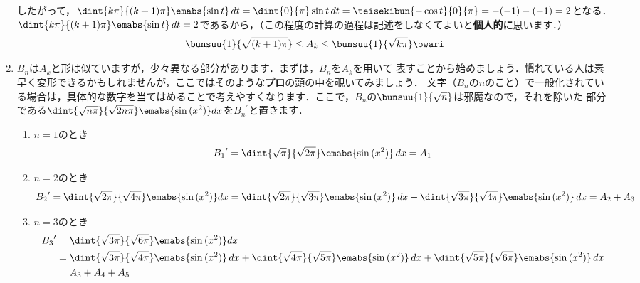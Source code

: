 \documentclass[../../../doc/main]{subfiles}
\begin{document}
\begin{enumerate}
            \textcolor{myBlue2}{したがって，$\dint{k\pi}{(k+1)\pi}\emabs{\sin{t}}\,dt=\dint{0}{\pi}\sin{t}\,dt=\teisekibun{-\cos{t}}{0}{\pi}=-(-1)-(-1)=2$となる．} \\
            $\dint{k\pi}{(k+1)\pi}\emabs{\sin{t}}\,dt=2$であるから，\textcolor{myBlue2}{（この程度の計算の過程は記述をしなくてよいと{\bf 個人的に}思います．）}
            \begin{align*}
                \bunsuu{1}{\sqrt{(k+1)\pi}}\leq A_k \leq \bunsuu{1}{\sqrt{k\pi}}\owari
            \end{align*}
            \item [\kakkoni] \textcolor{myBlue2}{$B_n$は$A_k$と形は似ていますが，少々異なる部分があります．まずは，$B_n$を$A_k$を用いて
            表すことから始めましょう．慣れている人は素早く変形できるかもしれませんが，ここではそのような{\bf プロ}の頭の中を覗いてみましょう．
            文字（$B_n$の$n$のこと）で一般化されている場合は，具体的な数字を当てはめることで考えやすくなります．ここで，$B_n$の$\bunsuu{1}{\sqrt{n}}$は邪魔なので，それを除いた
            部分である$\dint{\sqrt{n\pi}}{\sqrt{2n\pi}}\emabs{\sin{(x^2)}}dx$を${B_n}^\prime$と置きます．
            \begin{enumerate}
                \item [\tokeiichi] $n=1$のとき
                \begin{align*}
                    {B_1}^\prime=\dint{\sqrt{\pi}}{\sqrt{2\pi}}\emabs{\sin{(x^2)}}\,dx=A_1
                \end{align*}
                \item [\tokeini] $n=2$のとき
                \begin{align*}
                    {B_2}^\prime&=\dint{\sqrt{2\pi}}{\sqrt{4\pi}}\emabs{\sin{(x^2)}}dx 
                    =\dint{\sqrt{2\pi}}{\sqrt{3\pi}}\emabs{\sin{(x^2)}}\,dx+\dint{\sqrt{3\pi}}{\sqrt{4\pi}}\emabs{\sin{(x^2)}}\,dx 
                    =A_2+A_3
                \end{align*}
                \item [\tokeisan] $n=3$のとき
                \begin{align*}
                    {B_3}^\prime&=\dint{\sqrt{3\pi}}{\sqrt{6\pi}}\emabs{\sin{(x^2)}}dx \\
                    &=\dint{\sqrt{3\pi}}{\sqrt{4\pi}}\emabs{\sin{(x^2)}}\,dx+\dint{\sqrt{4\pi}}{\sqrt{5\pi}}\emabs{\sin{(x^2)}}\,dx+\dint{\sqrt{5\pi}}{\sqrt{6\pi}}\emabs{\sin{(x^2)}}\,dx \\
                    &=A_3+A_4+A_5

\end{align*}
\end{enumerate}}
\end{enumerate}
\end{document}
